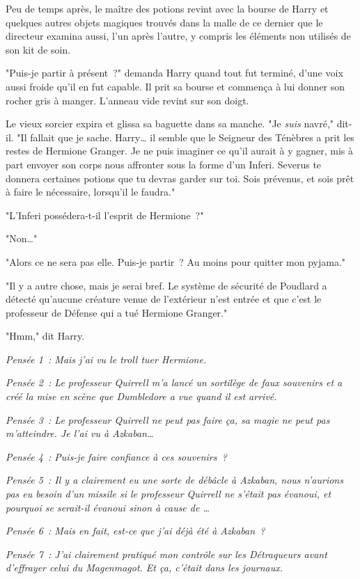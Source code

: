 Peu de temps après, le maître des potions revint avec la bourse de Harry et quelques autres objets magiques trouvés dans la malle de ce dernier que le directeur examina aussi, l'un après l'autre, y compris les éléments non utilisés de son kit de soin.

"Puis-je partir à présent~?" demanda Harry quand tout fut terminé, d'une voix aussi froide qu'il en fut capable. Il prit sa bourse et commença à lui donner son rocher gris à manger. L'anneau vide revint sur son doigt.

Le vieux sorcier expira et glissa sa baguette dans sa manche. "Je \emph{suis} navré," dit-il. "Il fallait que je sache. Harry… il semble que le Seigneur des Ténèbres a prit les restes de Hermione Granger. Je ne puis imaginer ce qu'il aurait à y gagner, mis à part envoyer son corps nous affronter sous la forme d'un Inferi. Severus te donnera certaines potions que tu devras garder sur toi. Sois prévenus, et sois prêt à faire le nécessaire, lorsqu'il le faudra."

"L'Inferi possédera-t-il l'esprit de Hermione~?"

"Non…"

"Alors ce ne sera pas elle. Puis-je partir~? Au moins pour quitter mon pyjama."

"Il y a autre chose, mais je serai bref. Le système de sécurité de Poudlard a détecté qu'aucune créature venue de l'extérieur n'est entrée et que c'est le professeur de Défense qui a tué Hermione Granger."

"Hmm," dit Harry.

\emph{Pensée 1~: Mais j'ai vu le troll tuer Hermione.}

\emph{Pensée 2~: Le professeur Quirrell m'a lancé un sortilège de faux souvenirs et a créé la mise en scène que Dumbledore a vue quand il est arrivé.}

\emph{Pensée 3~: Le professeur Quirrell ne peut pas faire ça, sa magie ne peut pas m'atteindre. Je l'ai vu à Azkaban…}

\emph{Pensée 4~: Puis-je faire confiance à ces souvenirs~?}

\emph{Pensée 5~: Il y a clairement eu une sorte de débâcle à Azkaban, nous n'aurions pas eu besoin d'un missile si le professeur Quirrell ne s'était pas évanoui, et pourquoi se serait-il évanoui sinon à cause de …}

\emph{Pensée 6~: Mais en fait, est-ce que j'ai déjà été à Azkaban~?}

\emph{Pensée 7~: J'ai clairement pratiqué mon contrôle sur les Détraqueurs avant d'effrayer celui du Magenmagot. Et \emph{ça}, c'était dans les journaux.}

